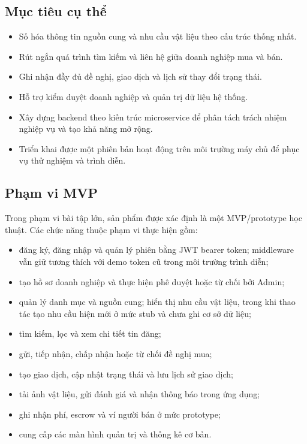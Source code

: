 \documentclass[12pt,a4paper,oneside]{report}
\begin{document}
\subsection{Mục tiêu cụ thể}

\begin{itemize}[leftmargin=1.1cm]
  \item Số hóa thông tin nguồn cung và nhu cầu vật liệu theo cấu trúc thống nhất.
  \item Rút ngắn quá trình tìm kiếm và liên hệ giữa doanh nghiệp mua và bán.
  \item Ghi nhận đầy đủ đề nghị, giao dịch và lịch sử thay đổi trạng thái.
  \item Hỗ trợ kiểm duyệt doanh nghiệp và quản trị dữ liệu hệ thống.
  \item Xây dựng backend theo kiến trúc microservice để phân tách trách nhiệm
  nghiệp vụ và tạo khả năng mở rộng.
  \item Triển khai được một phiên bản hoạt động trên môi trường máy chủ để phục
  vụ thử nghiệm và trình diễn.
\end{itemize}

\subsection{Phạm vi MVP}

Trong phạm vi bài tập lớn, sản phẩm được xác định là một MVP/prototype học thuật.
Các chức năng thuộc phạm vi thực hiện gồm:

\begin{itemize}[leftmargin=1.1cm]
  \item đăng ký, đăng nhập và quản lý phiên bằng JWT bearer token; middleware
  vẫn giữ tương thích với demo token cũ trong môi trường trình diễn;
  \item tạo hồ sơ doanh nghiệp và thực hiện phê duyệt hoặc từ chối bởi Admin;
  \item quản lý danh mục và nguồn cung; hiển thị nhu cầu vật liệu, trong khi thao
  tác tạo nhu cầu hiện mới ở mức stub và chưa ghi cơ sở dữ liệu;
  \item tìm kiếm, lọc và xem chi tiết tin đăng;
  \item gửi, tiếp nhận, chấp nhận hoặc từ chối đề nghị mua;
  \item tạo giao dịch, cập nhật trạng thái và lưu lịch sử giao dịch;
  \item tải ảnh vật liệu, gửi đánh giá và nhận thông báo trong ứng dụng;
  \item ghi nhận phí, escrow và ví người bán ở mức prototype;
  \item cung cấp các màn hình quản trị và thống kê cơ bản.
\end{itemize}
\end{document}
